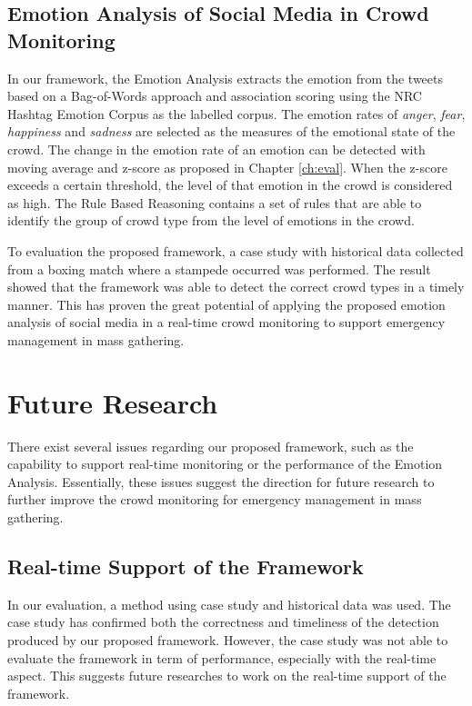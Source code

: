 \subsection{Emotion Analysis of Social Media in Crowd Monitoring}
In our framework, the Emotion Analysis extracts the emotion from the tweets based on a Bag-of-Words approach and association scoring using the NRC Hashtag Emotion Corpus \citep{mohammad2014using} as the labelled corpus. The emotion rates of \textit{anger}, \textit{fear}, \textit{happiness} and \textit{sadness} are selected as the measures of the emotional state of the crowd. The change in the emotion rate of an emotion can be detected with moving average and z-score as proposed in Chapter \ref{ch:eval}. When the z-score exceeds a certain threshold, the level of that emotion in the crowd is considered as high. The Rule Based Reasoning contains a set of rules that are able to identify the group of crowd type from the level of emotions in the crowd. 

To evaluation the proposed framework, a case study with historical data collected from a boxing match where a stampede occurred was performed. The result showed that the framework was able to detect the correct crowd types in a timely manner. This has proven the great potential of applying the proposed emotion analysis of social media in a real-time crowd monitoring to support emergency management in mass gathering.

\section{Future Research}
There exist several issues regarding our proposed framework, such as the capability to support real-time monitoring or the performance of the Emotion Analysis. Essentially, these issues suggest the direction for future research to further improve the crowd monitoring for emergency management in mass gathering.

\subsection{Real-time Support of the Framework}
In our evaluation, a method using case study and historical data was used. The case study has confirmed both the correctness and timeliness of the detection produced by our proposed framework. However, the case study was not able to evaluate the framework in term of performance, especially with the real-time aspect. This suggests future researches to work on the real-time support of the framework.

